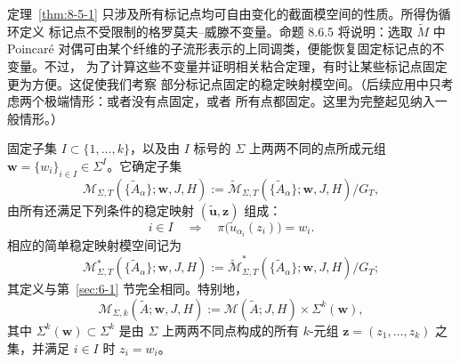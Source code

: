 定理~\ref{thm:8-5-1} 只涉及所有标记点均可自由变化的截面模空间的性质。所得伪循环定义
标记点不受限制的格罗莫夫--威滕不变量。命题 8.6.5 将说明：选取 $\widetilde M$ 中
Poincaré 对偶可由某个纤维的子流形表示的上同调类，便能恢复固定标记点的不变量。不过，
为了计算这些不变量并证明相关粘合定理，有时让某些标记点固定更为方便。这促使我们考察
部分标记点固定的稳定映射模空间。（后续应用中只考虑两个极端情形：或者没有点固定，或者
所有点都固定。这里为完整起见纳入一般情形。）

固定子集 $I\subset\{1,\ldots,k\}$，以及由 $I$ 标号的 $\Sigma$ 上两两不同的点所成元组
$\mathbf w=\{w_i\}_{i\in I}\in\Sigma^I$。它确定子集
\[
  \mathcal M_{\Sigma,T}(\{\widetilde A_\alpha\};\mathbf w,J,H)
  :=\widetilde{\mathcal M}_{\Sigma,T}
    (\{\widetilde A_\alpha\};\mathbf w,J,H)/G_T,
\]
由所有还满足下列条件的稳定映射 $(\widetilde{\mathbf u},\mathbf z)$ 组成：
\begin{equation}\label{eq:8-5-3}
  i\in I
  \quad\Longrightarrow\quad
  \pi\bigl(\widetilde u_{\alpha_i}(z_i)\bigr)=w_i.
\end{equation}
相应的简单稳定映射模空间记为
\[
  \mathcal M^*_{\Sigma,T}(\{\widetilde A_\alpha\};\mathbf w,J,H)
  :=\widetilde{\mathcal M}^*_{\Sigma,T}
    (\{\widetilde A_\alpha\};\mathbf w,J,H)/G_T;
\]
其定义与第~\ref{sec:6-1} 节完全相同。特别地，
\begin{equation}\label{eq:8-5-4}
  \mathcal M_{\Sigma,k}(\widetilde A;\mathbf w,J,H)
  :=\mathcal M(\widetilde A;J,H)\times\Sigma^k(\mathbf w),
\end{equation}
其中 $\Sigma^k(\mathbf w)\subset\Sigma^k$ 是由 $\Sigma$ 上两两不同点构成的所有
$k$-元组 $\mathbf z=(z_1,\ldots,z_k)$ 之集，并满足 $i\in I$ 时 $z_i=w_i$。

